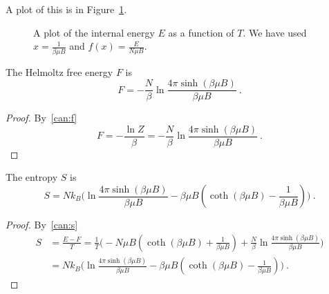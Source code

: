     A plot of this is in Figure~\ref{can:magen}.
    \begin{figure}
        \centering
        \caption{A plot of the internal energy $E$ as a function of $T$. We have used $x = \frac{1}{\beta \mu B}$ and $f(x) = \frac{E}{N \mu B}$.}
        \label{can:magen}
    \end{figure}
    
    The Helmoltz free energy $F$ is 
    \begin{equation*}
        F = - \frac{N}{\beta} \ln \frac{4 \pi \sinh (\beta \mu B)}{\beta \mu B} ~.
    \end{equation*}
    \begin{proof}
        By~\eqref{can:f}
        \begin{equation*}
            F = - \frac{\ln Z}{\beta} = - \frac{N}{\beta} \ln \frac{4 \pi \sinh (\beta \mu B)}{\beta \mu B} ~.
        \end{equation*}
    \end{proof}
    
    The entropy $S$ is 
    \begin{equation*}
        S = N k_B \Big ( \ln \frac{4 \pi \sinh (\beta \mu B)}{\beta \mu B}  - \beta \mu B (\coth (\beta \mu B) - \frac{1}{\beta \mu B} ) \Big ) ~.
    \end{equation*}
    \begin{proof}
        By~\eqref{can:s}
        \begin{equation*}
        \begin{aligned}
            S & = \frac{E - F}{T} = \frac{1}{T} \Big (- N \mu B (\coth (\beta \mu B) + \frac{1}{\beta \mu B} ) + \frac{N}{\beta} \ln \frac{4 \pi \sinh (\beta \mu B)}{\beta \mu B}  \Big ) \\ & = N k_B \Big ( \ln \frac{4 \pi \sinh (\beta \mu B)}{\beta \mu B}  - \beta \mu B (\coth (\beta \mu B) - \frac{1}{\beta \mu B} ) \Big )~. 
        \end{aligned}
        \end{equation*}
    \end{proof}

